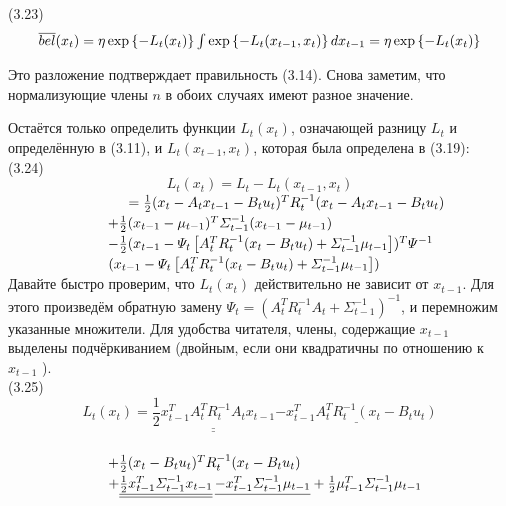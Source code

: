 \documentclass[10pt,a4paper]{article}
\begin{document}
(3.23)
\begin{multline*}
$$\overline{bel}(x_t)=\eta\exp\left\lbrace -L_t(x_t)\right\rbrace\int\exp\left\lbrace -L_t(x_{t-1},x_t)\right\rbrace dx_{t-1}=\eta  \exp\left\lbrace -L_t(x_t)\right\rbrace $$ 
\end{multline*}

Это разложение подтверждает правильность (3.14). Снова заметим, что нормализующие члены $n$ в обоих случаях имеют разное значение.

Остаётся только определить функции $L_t(x_t)$, означающей разницу $L_t$ и определённую в (3.11), и $L_t(x_{t-1},x_t)$, которая была определена в (3.19):\\

(3.24)
$$L_t(x_t)=L_t-L_t(x_{t-1},x_t)$$
$\hspace{30mm}=\frac{1}{2}(x_t-A_t x_{t-1}-B_t u_t)^T R_t^{-1}(x_t-A_t x_{t-1}-B_t u_t)$\\

$\hspace{25mm} +\frac{1}{2}(x_{t-1}-\mu_{t-1})^T \varSigma_{t-1}^{-1}(x_{t-1}-\mu_{t-1})$\\

$ \hspace{25mm} -\frac{1}{2}(x_{t-1}-\varPsi_t\left[A_t^T R_t^{-1}(x_t-B_t u_t)+\varSigma_{t-1}^{-1}\mu_{t-1}\right])^T \varPsi^{-1}$\\

$ \hspace{25mm} (x_{t-1}-\varPsi_t\left[A_t^T R_t^{-1}(x_t-B_t u_t)+\varSigma_{t-1}^{-1}\mu_{t-1}\right])$\\ 

Давайте быстро проверим, что $L_t(x_t)$ действительно не зависит от $x_{t-1}$. Для этого произведём обратную замену $\varPsi_t=(A_t^T R_t^{-1}A_t+\varSigma_{t-1}^{-1})^{-1}$, и перемножим указанные множители. Для удобства читателя, члены, содержащие $x_{t-1}$ выделены подчёркиванием (двойным, если они квадратичны по отношению к $x_{t-1}$ ).\\

(3.25)
$$L_t(x_t)=\underline{\underline{\frac{1}{2}x_{t-1}^T A_t^T R_t^{-1}A_t x_{t-1}}}\underline{-x_{t-1}^T A_t^T R_t^{-1}(x_t-B_t u_t)}$$\\

$\hspace{25mm}+\frac{1}{2}(x_t-B_t u_t)^T R_t^{-1}(x_t-B_t u_t)$\\

$\hspace{25mm}+\underline{\underline{\frac{1}{2}x_{t-1}^T \varSigma_{t-1}^{-1}x_{t-1}}}\,\underline{-x_{t-1}^T \varSigma_{t-1}^{-1}\mu_{t-1}}+\frac{1}{2}\mu_{t-1}^T \varSigma_{t-1}^{-1}\mu_{t-1}$\\
\end{document}
